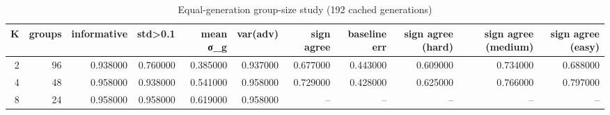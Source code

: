 \begin{table}
\caption{Equal-generation group-size study (192 cached generations)}
\label{tab:t3_group_size}
\begin{tabular}{rrrrrrrrrrr}
\toprule
K & groups & informative & std>0.1 & mean σ\_g & var(adv) & sign agree & baseline err & sign agree (hard) & sign agree (medium) & sign agree (easy) \\
\midrule
2 & 96 & 0.938000 & 0.760000 & 0.385000 & 0.937000 & 0.677000 & 0.443000 & 0.609000 & 0.734000 & 0.688000 \\
4 & 48 & 0.958000 & 0.938000 & 0.541000 & 0.958000 & 0.729000 & 0.428000 & 0.625000 & 0.766000 & 0.797000 \\
8 & 24 & 0.958000 & 0.958000 & 0.619000 & 0.958000 & -- & -- & -- & -- & -- \\
\bottomrule
\end{tabular}
\end{table}
